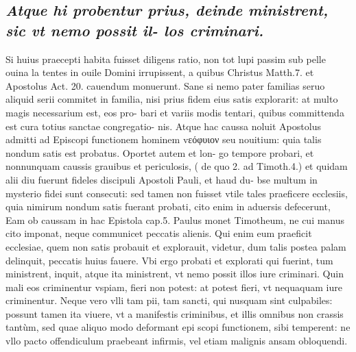 \documentclass{article}
\begin{document}
\begin{pages}
\subsection*{\textit{Atque hi probentur prius, deinde ministrent, sic vt nemo possit il- los criminari. }}\pstart Si huius praecepti habita fuisset diligens ratio, non tot lupi passim sub pelle ouina la tentes in ouile Domini irrupissent, a quibus Christus Matth.7. et Apostolus Act. 20. cauendum monuerunt. Sane si nemo pater familias seruo aliquid serii commitet in familia, nisi prius fidem eius satis explorarit: at multo magis necessarium est, eos pro- bari et variis modis tentari, quibus committenda est cura totius sanctae congregatio- nis. Atque hac caussa noluit Apostolus admitti ad Episcopi functionem hominem vεόφυιον seu nouitium: quia talis nondum satis est probatus. Oportet autem et lon- go tempore probari, et nonnunquam caussis grauibus et periculosis, ( de quo 2. ad Timoth.4.) et quidam alii diu fuerunt fideles discipuli Apostoli Pauli, et haud du- bse multum in mysterio fidei sunt consecuti: sed tamen non fuisset vtile tales praeficere ecclesiis, quia nimirum nondum satis fuerant probati, cito enim in aduersis defecerunt, Eam ob caussam in hac Epistola cap.5. Paulus monet Timotheum, ne cui manus cito imponat, neque communicet peccatis alienis. Qui enim eum praeficit ecclesiae, quem non satis probauit et explorauit, videtur, dum talis postea palam delinquit, peccatis huius fauere. Vbi ergo probati et explorati qui fuerint, tum ministrent, inquit, atque ita ministrent, vt nemo possit illos iure criminari. Quin mali eos criminentur vspiam, fieri non potest: at potest fieri, vt nequaquam iure criminentur. Neque vero vlli tam pii, tam sancti, qui nusquam sint culpabiles: possunt tamen ita viuere, vt a manifestis criminibus, et illis omnibus non crassis tantùm, sed quae aliquo modo deformant epi scopi functionem, sibi temperent: ne vllo pacto offendiculum praebeant infirmis, vel etiam malignis ansam obloquendi.  \pend
{}
{}

\end{pages}
\end{document}
